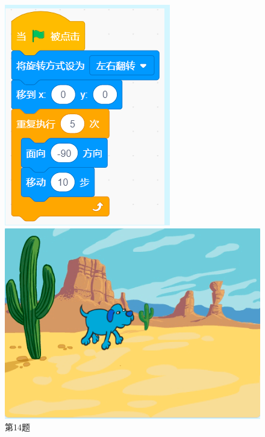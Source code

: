 \documentclass[10pt, a4paper]{article}
\begin{document}
\begin{enumerate}
\begin{figure}[htbp]
\begin{minipage}[t]{.35\textwidth}
\begin{minipage}[t]{.4\textwidth}
                    \includegraphics[width=\textwidth]{14-1.png}
                \end{minipage}
                \begin{minipage}[t]{.5\textwidth}
                    \centering
                    \includegraphics[width=\textwidth]{14-2.png}
                \end{minipage}
                \caption*{第14题}
            \end{minipage}
        \end{figure}


\end{enumerate}
\end{document}
